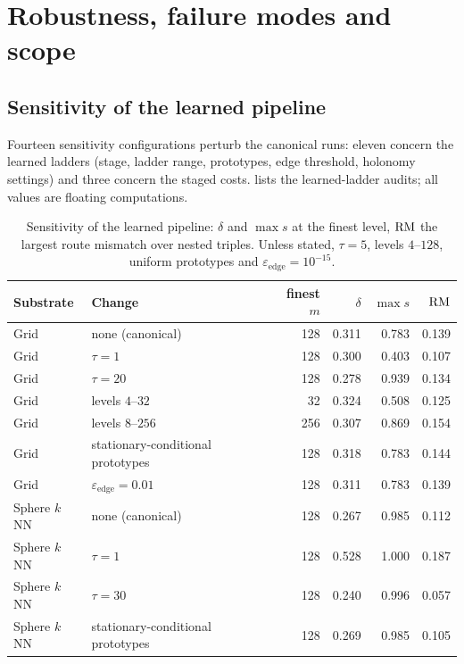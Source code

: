\section{Robustness, failure modes and scope}
\label{sec:limits}

\subsection{Sensitivity of the learned pipeline}

Fourteen sensitivity configurations perturb the canonical runs: eleven concern the learned ladders (stage, ladder range, prototypes, edge threshold, holonomy settings) and three concern the staged costs.
 lists the learned-ladder audits; all values are floating computations.

\begin{table}[t]
\centering
\small
\caption{Sensitivity of the learned pipeline: $\delta$ and $\max s$ at the finest level, $\mathrm{RM}$ the largest route mismatch over nested triples. Unless stated, $\tau=5$, levels $4$--$128$, uniform prototypes and $\varepsilon_{\mathrm{edge}}=10^{-15}$.}
\label{tab:sweeps}
\begin{tabular}{@{}llrrrr@{}}
\toprule
Substrate & Change & finest $m$ & $\delta$ & $\max s$ & $\mathrm{RM}$ \\
\midrule
Grid & none (canonical) & 128 & 0.311 & 0.783 & 0.139 \\
Grid & $\tau=1$ & 128 & 0.300 & 0.403 & 0.107 \\
Grid & $\tau=20$ & 128 & 0.278 & 0.939 & 0.134 \\
Grid & levels $4$--$32$ & 32 & 0.324 & 0.508 & 0.125 \\
Grid & levels $8$--$256$ & 256 & 0.307 & 0.869 & 0.154 \\
Grid & stationary-conditional prototypes & 128 & 0.318 & 0.783 & 0.144 \\
Grid & $\varepsilon_{\mathrm{edge}}=0.01$ & 128 & 0.311 & 0.783 & 0.139 \\
Sphere $k$NN & none (canonical) & 128 & 0.267 & 0.985 & 0.112 \\
Sphere $k$NN & $\tau=1$ & 128 & 0.528 & 1.000 & 0.187 \\
Sphere $k$NN & $\tau=30$ & 128 & 0.240 & 0.996 & 0.057 \\
Sphere $k$NN & stationary-conditional prototypes & 128 & 0.269 & 0.985 & 0.105 \\
\bottomrule
\end{tabular}
\end{table}

